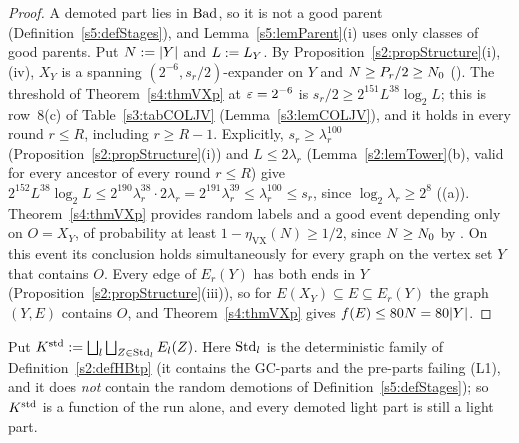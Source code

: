 \begin{proof}
A demoted part lies in $\mathrm{Bad}$, so it is not a good parent (Definition~\ref{s5:defStages}), and Lemma~\ref{s5:lemParent}(i) uses only classes of good parents. Put $N\mathrel{:=}|Y|$ and $L\mathrel{:=} L_Y$. By Proposition~\ref{s2:propStructure}(i),(iv), $X_Y$ is a spanning $(2^{-6},s_r/2)$-expander on $Y$ and $N\ge P_r/2\ge N_{0}$ (). The threshold of Theorem~\ref{s4:thmVXp} at $\varepsilon=2^{-6}$ is $s_r/2\ge2^{151}L^{38}\log_2L$; this is row~8(c) of Table~\ref{s3:tabCOLJV} (Lemma~\ref{s3:lemCOLJV}), and it holds in every round $r\le R$, including $r\ge R-1$. Explicitly, $s_r\ge\lambda_r^{100}$ (Proposition~\ref{s2:propStructure}(i)) and $L\le2\lambda_r$ (Lemma~\ref{s2:lemTower}(b), valid for every ancestor of every round $r\le R$) give $2^{152}L^{38}\log_2L\le2^{190}\lambda_r^{38}\cdot2\lambda_r=2^{191}\lambda_r^{39}\le\lambda_r^{100}\le s_r$, since $\log_2\lambda_r\ge2^8$ ((a)). Theorem~\ref{s4:thmVXp} provides random labels and a good event depending only on $O=X_Y$, of probability at least $1-\eta_{\mathrm{VX}}(N)\ge1/2$, since $N\ge N_{0}$ by . On this event its conclusion holds simultaneously for every graph on the vertex set $Y$ that contains $O$. Every edge of $E_r(Y)$ has both ends in $Y$ (Proposition~\ref{s2:propStructure}(iii)), so for $E(X_Y)\subseteq E\subseteq E_r(Y)$ the graph $(Y,E)$ contains $O$, and Theorem~\ref{s4:thmVXp} gives $f(E)\le80N=80|Y|$.
\end{proof}

Put $K^{\mathrm{std}}\mathrel{:=}\bigsqcup_{l}\bigsqcup_{Z\in\mathrm{Std}_l}E_l(Z)$. Here $\mathrm{Std}_l$ is the deterministic family of Definition~\ref{s2:defHBtp} (it contains the GC-parts and the pre-parts failing (L1), and it does \emph{not} contain the random demotions of Definition~\ref{s5:defStages}); so $K^{\mathrm{std}}$ is a function of the run alone, and every demoted light part is still a light part.

